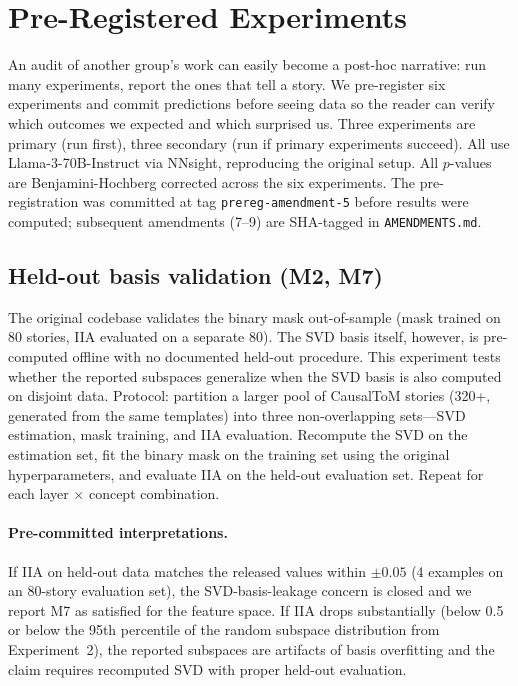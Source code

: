 \documentclass{article}
\begin{document}
\section{Pre-Registered Experiments}
\label{sec:experiments}

An audit of another group's work can easily become a post-hoc narrative: run many experiments, report the ones that tell a story. We pre-register six experiments and commit predictions before seeing data so the reader can verify which outcomes we expected and which surprised us. Three experiments are primary (run first), three secondary (run if primary experiments succeed). All use Llama-3-70B-Instruct via NNsight, reproducing the original setup. All $p$-values are Benjamini-Hochberg corrected across the six experiments. The pre-registration was committed at tag \texttt{prereg-amendment-5} before results were computed; subsequent amendments (7--9) are SHA-tagged in \texttt{AMENDMENTS.md}.

\subsection{Held-out basis validation (M2, M7)}

The original codebase validates the binary mask out-of-sample (mask trained on 80 stories, IIA evaluated on a separate 80). The SVD basis itself, however, is pre-computed offline with no documented held-out procedure. This experiment tests whether the reported subspaces generalize when the SVD basis is also computed on disjoint data. Protocol: partition a larger pool of CausalToM stories (320+, generated from the same templates) into three non-overlapping sets---SVD estimation, mask training, and IIA evaluation. Recompute the SVD on the estimation set, fit the binary mask on the training set using the original hyperparameters, and evaluate IIA on the held-out evaluation set. Repeat for each layer $\times$ concept combination.

\paragraph{Pre-committed interpretations.} If IIA on held-out data matches the released values within $\pm 0.05$ (4 examples on an 80-story evaluation set), the SVD-basis-leakage concern is closed and we report M7 as satisfied for the feature space. If IIA drops substantially (below 0.5 or below the 95th percentile of the random subspace distribution from Experiment~2), the reported subspaces are artifacts of basis overfitting and the claim requires recomputed SVD with proper held-out evaluation.
\end{document}
